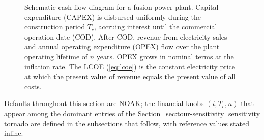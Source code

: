 \documentclass{article}
\begin{document}
\begin{figure}[htbp]
\centering
{}
\caption{Schematic cash-flow diagram for a fusion power plant.
  Capital expenditure (CAPEX) is disbursed uniformly during the
  construction period $T_c$, accruing interest until the commercial
  operation date (COD). After COD, revenue from electricity sales and
  annual operating expenditure (OPEX) flow over the plant operating
  lifetime of $n$ years. OPEX grows in nominal terms at the inflation
  rate. The LCOE (\cref{eq:lcoe}) is the constant electricity price at
  which the present value of revenue equals the present value of all
  costs.}
\label{fig:cashflow}
\end{figure}

Defaults throughout this section are NOAK; the financial knobs
$(i, T_c, n)$ that appear among the dominant entries of the
Section~\ref{sec:tour-sensitivity} sensitivity tornado are defined
in the subsections that follow, with reference values stated
inline.
\end{document}
